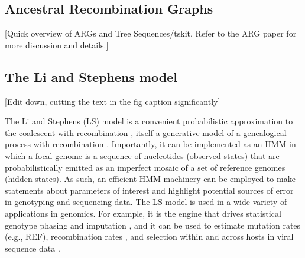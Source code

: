 \documentclass{article}
\begin{document}

\subsection{Ancestral Recombination Graphs}
[Quick overview of ARGs and Tree Sequences/tskit. Refer to the ARG paper for
more discussion and details.]


\subsection{The Li and Stephens model}
[Edit down, cutting the text in the fig caption significantly]

The Li and Stephens (LS) model is
a convenient probabilistic approximation to the coalescent with recombination
\citep{Hudson1983-if}, itself a generative model of a genealogical process with
recombination \citep{Li2003-ib}. Importantly, it can be implemented as an HMM
in which a focal genome is a sequence of nucleotides (observed states) that are
probabilistically emitted as an imperfect mosaic of a set of reference genomes
(hidden states). As such, an efficient HMM machinery can be employed to make
statements about parameters of interest and highlight potential sources of
error in genotyping and sequencing data. The LS model is used in a wide variety
of applications in genomics. For example, it is the engine that drives
statistical genotype phasing and imputation
\citep{Delaneau2019-wl,Browning2021-cg,Browning2018-nk,Rubinacci2020-pa}, and
it can be used to estimate mutation rates (e.g., REF), recombination rates
\citep[e.g.][]{Hinch2011-tz}, and selection within and across hosts in viral
sequence data \citep[e.g.][]{Palmer2019-wa}.
\end{document}
